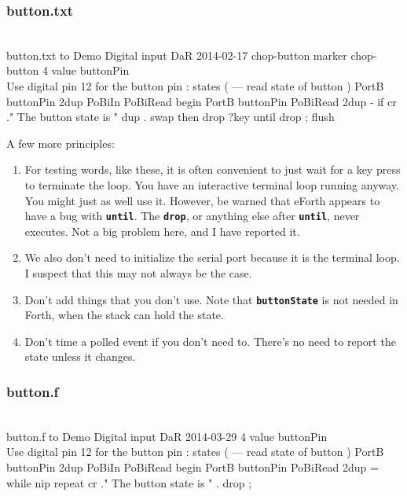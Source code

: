 \documentclass[10pt,english]{article}
\begin{document}
\subsubsection{button.txt}

\nwenddocs{}\endmoddef
\\ button.txt to Demo Digital input      DaR 2014-02-17
chop-button
marker chop-button
4 value buttonPin \\ Use digital pin 12 for the button pin
: states ( --- read state of button )
   PortB buttonPin 2dup PoBiIn  PoBiRead
   begin  PortB buttonPin PoBiRead  2dup - if
         cr ." The button state is "  dup . swap
   then  drop  ?key until  drop ;
flush
\nwendcode{}\nwdocspar

A few more principles:
\begin{enumerate}
\item For testing words, like these, it is often convenient to just wait
for a key press to terminate the loop. You have an interactive terminal
loop running anyway. You might just as well use it. However, be warned
that eForth appears to have a bug with \texttt{\textbf{until}}. The
\texttt{\textbf{drop}}, or anything else after \texttt{\textbf{until}},
never executes. Not a big problem here, and I have reported it.
\item We also don't need to initialize the serial port because it is the
terminal loop. I suspect that this may not always be the case.
\item Don't add things that you don't use. Note that \texttt{\textbf{buttonState}}
is not needed in Forth, when the stack can hold the state.
\item Don't time a polled event if you don't need to. There's no need to
report the state unless it changes.
\end{enumerate}

\subsubsection{button.f}

\nwenddocs{}\endmoddef
\\ button.f to Demo Digital input      DaR 2014-03-29
4 value buttonPin \\ Use digital pin 12 for the button pin
: states ( --- read state of button )
   PortB buttonPin 2dup PoBiIn  PoBiRead
   begin  PortB buttonPin PoBiRead
      2dup = while  nip  repeat
   cr ." The button state is " . drop ;
\nwendcode{}\nwdocspar
\end{document}
